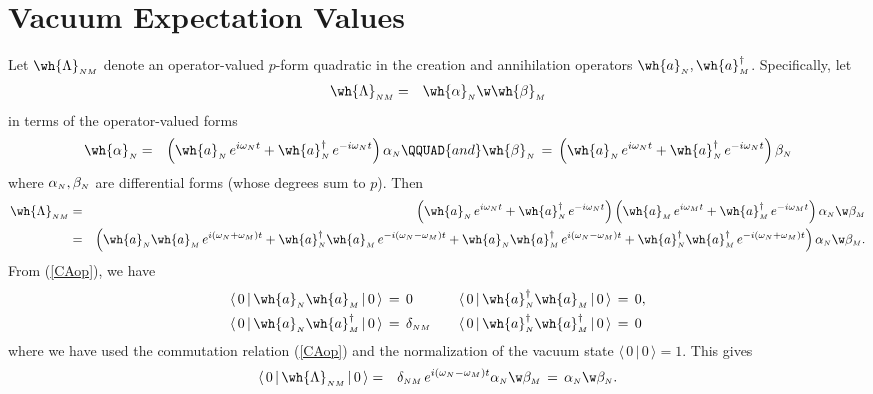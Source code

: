 \documentclass[sections]{tjwNOTES}
\newcommand\N{\mbox{\tiny $N$}}
\renewcommand\M{\mbox{\tiny $M$}}
\newcommand\qquadand{\QQUAD{and}}
\newcommand\ahat[1]{\wh{a}_{#1}}
\newcommand\adag[1]{\wh{a}^{\dagger}_{#1}}
\newcommand\VEV[1]{ \langle \, 0 \, | \, #1 \,| \, 0 \, \rangle }
\begin{document}
\section{Vacuum Expectation Values}\label{sect:OpRel}
Let $\wh{\Lambda}_{\N\M}$ denote an operator-valued $p$-form quadratic in the creation and annihilation operators $\ahat{\N},\adag{\M}$. Specifically, let
\begin{eqnarray*}
    \wh{\Lambda}_{\N\M} &=& \wh{\alpha}_{\N} \w \wh{\beta}_{\M}
\end{eqnarray*}
in terms of the operator-valued forms
\begin{eqnarray*}
    \wh{\alpha}_{\N} &=& \left( \ahat{\N}\,e^{i\omega_{\N}t} + \adag{\N}\,e^{-i\omega_{\N}t} \right)\alpha_{\N} \qquadand \wh{\beta}_{\N} \,=\, \left( \ahat{\N}\,e^{i\omega_{\N}t} + \adag{\N}\,e^{-i\omega_{\N}t} \right)\beta_{\N}
\end{eqnarray*}
where $\alpha_{\N},\beta_{\N}$ are differential forms (whose degrees sum to $p$). Then
\begin{eqnarray*}
    \wh{\Lambda}_{\N\M} &=& \left( \ahat{\N}\,e^{i\omega_{\N}t} + \adag{\N}\,e^{-i\omega_{\N}t} \right)\left( \ahat{\M}\,e^{i\omega_{\M}t} + \adag{\M}\,e^{-i\omega_{\M}t} \right)\alpha_{\N}\w\beta_{\M} \\
    &=& \left( \ahat{\N}\ahat{\M}\,e^{i(\omega_{\N}+\omega_{\M})t} + \adag{\N}\ahat{\M}\,e^{-i(\omega_{\N}-\omega_{\M})t} + \ahat{\N}\adag{\M}\,e^{i(\omega_{\N}-\omega_{\M})t} + \adag{\N}\adag{\M}\,e^{-i(\omega_{\N}+\omega_{\M})t}\right)\alpha_{\N}\w\beta_{\M}.
\end{eqnarray*}
From (\ref{CAop}), we have
\begin{equation*}
\begin{alignedat}{2}
    \VEV{\ahat{\N}\ahat{\M}} &\,=\, 0 & \qquad \VEV{\adag{\N}\ahat{\M}} &\,=\, 0, \\
    \VEV{\ahat{\N}\adag{\M}} &\,=\, \delta_{\N\M} & \qquad \VEV{\adag{\N}\adag{\M}} &\,=\, 0
\end{alignedat}
\end{equation*}
where we have used the commutation relation (\ref{CAop}) and the normalization of the vacuum state $\langle \,0\,|\,0\,\rangle=1$. This gives
\begin{eqnarray*}
    \VEV{\wh{\Lambda}_{\N\M}} &=& \delta_{\N\M}\,e^{i(\omega_{\N}-\omega_{\M})t} \alpha_{\N}\w\beta_{\M} \,=\, \alpha_{\N} \w \beta_{\N}.
\end{eqnarray*}
\end{document}
